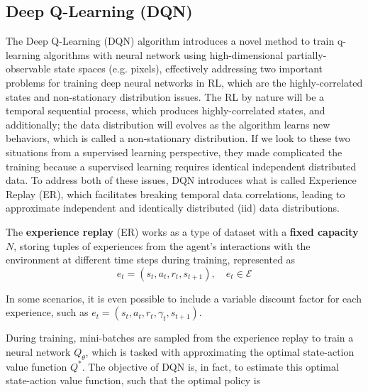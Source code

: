 


\subsection{Deep Q-Learning (DQN)}
\label{sec:dqn}
The Deep Q-Learning (DQN) \cite{mnih2013playing, mnih2015human} algorithm introduces a novel method to train q-learning algorithms with neural network using high-dimensional partially-observable state spaces (e.g. pixels), effectively addressing two important problems for training deep neural networks in RL, which are the highly-correlated states and non-stationary distribution issues. The RL by nature will be a temporal sequential process, which produces highly-correlated states, and additionally; the data distribution will evolves as the algorithm learns new behaviors, which is called a non-stationary distribution. If we look to these two situations from a supervised learning perspective, they made complicated the training because a supervised learning requires identical independent distributed data. To address both of these issues, DQN introduces what is called Experience Replay (ER), which facilitates breaking temporal data correlations, leading to approximate independent and identically distributed (iid) data distributions.

The \textbf{experience replay} (ER) works as a type of dataset with a \textbf{fixed capacity} $N$, storing tuples of experiences from the agent's interactions with the environment at different time steps during training, represented as
$$e_t = (s_t, a_t, r_t, s_{t+1}), \quad e_t \in \mathcal{E}$$

In some scenarios, it is even possible to include a variable discount factor for each experience, such as $e_t = (s_t, a_t, r_t, \gamma_t, s_{t+1})$.

During training, mini-batches are sampled from the experience replay to train a neural network $Q_\theta$, which is tasked with approximating the optimal state-action value function $Q^*$. The objective of DQN is, in fact, to estimate this optimal state-action value function, such that the optimal policy is

